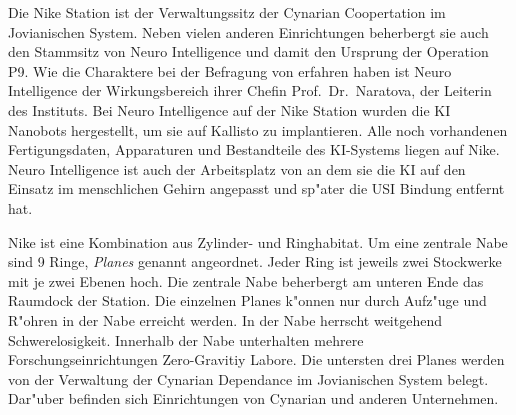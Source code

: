 
Die Nike Station ist der Verwaltungssitz der Cynarian Coopertation im Jovianischen System. Neben vielen anderen Einrichtungen beherbergt sie auch den Stammsitz von Neuro Intelligence und damit den Ursprung der Operation P9. Wie die Charaktere bei der Befragung von \ml{} erfahren haben ist Neuro Intelligence der Wirkungsbereich ihrer Chefin Prof.~Dr.~Naratova, der Leiterin des Instituts. Bei Neuro Intelligence auf der Nike Station wurden die KI Nanobots hergestellt, um sie auf Kallisto zu implantieren. Alle noch vorhandenen Fertigungsdaten, Apparaturen und Bestandteile des KI-Systems liegen auf Nike. Neuro Intelligence ist auch der Arbeitsplatz von \ml{} an dem sie die KI auf den Einsatz im menschlichen Gehirn angepasst und sp"ater die USI Bindung entfernt hat.

Nike ist eine Kombination aus Zylinder- und Ringhabitat. Um eine zentrale Nabe sind 9 Ringe, \emph{Planes} genannt angeordnet. Jeder Ring ist jeweils zwei Stockwerke mit je zwei Ebenen hoch. Die zentrale Nabe beherbergt am unteren Ende das Raumdock der Station.  Die einzelnen Planes k"onnen nur durch Aufz"uge und R"ohren in der Nabe erreicht werden. In der Nabe herrscht weitgehend Schwerelosigkeit. Innerhalb der Nabe unterhalten mehrere Forschungseinrichtungen Zero-Gravitiy Labore. Die untersten drei Planes werden von der Verwaltung der Cynarian Dependance im Jovianischen System belegt. Dar"uber befinden sich Einrichtungen von Cynarian und anderen Unternehmen.

